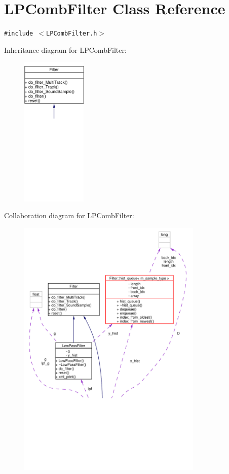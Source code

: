 \hypertarget{classLPCombFilter}{
\section{LPComb\-Filter Class Reference}
\label{classLPCombFilter}
}
{\tt \#include $<$LPComb\-Filter.h$>$}

Inheritance diagram for LPComb\-Filter:\begin{figure}[H]
\begin{center}
\leavevmode
\includegraphics[width=88pt]{classLPCombFilter__inherit__graph}
\end{center}
\end{figure}
Collaboration diagram for LPComb\-Filter:\begin{figure}[H]
\begin{center}
\leavevmode
\includegraphics[width=250pt]{classLPCombFilter__coll__graph}
\end{center}
\end{figure}
